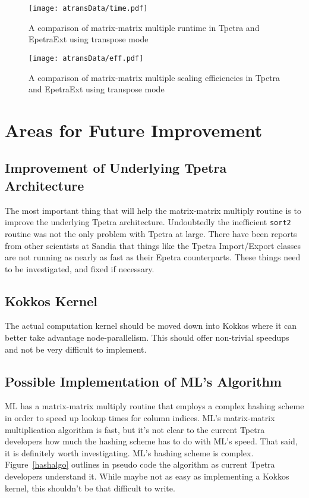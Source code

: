\documentclass[pdf,12pt, strict]{SANDreport}
\begin{document}
\begin{figure}
\centering
\texttt{[image: atransData/time.pdf]}
\caption[Transpose Time Comparison]{A comparison of matrix-matrix multiple runtime in Tpetra and EpetraExt using transpose mode}
\label{transtime}
\end{figure}

\begin{figure}
\centering
\texttt{[image: atransData/eff.pdf]}
\caption[Transpose Efficiency Comparison]{A comparison of matrix-matrix multiple scaling efficiencies in Tpetra and EpetraExt using transpose mode}
\label{transeff}
\end{figure}

\section{Areas for Future Improvement}
\subsection{Improvement of Underlying Tpetra Architecture}
The most important thing that will help the matrix-matrix multiply routine is to improve the underlying Tpetra architecture. 
Undoubtedly the inefficient \verb!sort2! routine was not the only problem with Tpetra at large. There have been reports from other 
scientists at Sandia that things like the Tpetra Import/Export classes are not running as nearly as fast as their Epetra 
counterparts. These things need to be investigated, and fixed if necessary.

\subsection{Kokkos Kernel}
The actual computation kernel should be moved down into Kokkos where it can better take advantage node-parallelism. 
This should offer non-trivial speedups and not be very difficult to implement.

\subsection{Possible Implementation of ML's Algorithm}
ML has a matrix-matrix multiply routine that employs a complex hashing scheme in order to speed up lookup times for 
column indices. ML's matrix-matrix multiplication algorithm is fast, but it's not clear to the current Tpetra developers 
how much the hashing scheme has to do with ML's speed. That said, it is definitely worth investigating. ML's hashing scheme 
is complex. Figure~\ref{hashalgo} outlines in pseudo code the algorithm as current Tpetra developers 
understand it. While maybe not as easy as implementing a Kokkos kernel, this shouldn't be that difficult to write.
\end{document}
